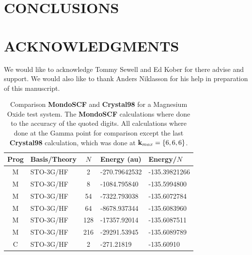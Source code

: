 \documentclass[prb,aps,nobibnotes,twocolumn,doublespace,twocolumngrid,superbib]{revtex4}
\begin{document}
\section{CONCLUSIONS}


\section*{ACKNOWLEDGMENTS}

We would like to acknowledge Tommy Sewell and Ed Kober for there advise
and support. We would also like to thank Anders Niklasson for his help
in preparation of this manuscript. 

 



\eject

\begin{table}
\caption{Comparison \textbf{MondoSCF} and \textbf{Crystal98} for a 
Magnesium Oxide test system. The \textbf{MondoSCF} calculations where done to
the accuracy of the quoted digits. All calculations where done at the Gamma point
for comparison except the last \textbf{Crystal98} calculation, which was done at 
${\bf k}_{max}=\{6,6,6\}$.}
\label{table:ComToCrystal98}
 
\begin{tabular}{clcll}
\hline 
Prog&
Basis/Theory&
\( N \)&
Energy  (au)&
Energy/{$N$}\\
\hline
\hline 
M &
STO-3G/HF &
2 &
-270.79642532 &
-135.39821266 \\
M&
STO-3G/HF&
8&
-1084.795840 &
-135.5994800 \\
M&
STO-3G/HF&
54&
-7322.793038 &
-135.6072784 \\
M&
STO-3G/HF&
64&
-8678.937344 &
-135.6083960 \\
M&
STO-3G/HF&
128 &
-17357.92014 &
-135.6087511\\
M&
STO-3G/HF&
216&
-29291.53945 &
-135.6089789 \\
\hline
C&
STO-3G/HF&
2&
-271.21819 &
-135.60910 \\
\hline 
\hline
\end{tabular}
\end{table}
\end{document}
